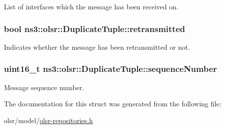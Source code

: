 List of interfaces which the message has been received on. 

\subsubsection[{\texorpdfstring{retransmitted}{retransmitted}}]{\setlength{\rightskip}{0pt plus 5cm}bool ns3\+::olsr\+::\+Duplicate\+Tuple\+::retransmitted}\hypertarget{structns3_1_1olsr_1_1DuplicateTuple_acab89a10cc5023318dc97c5adbb4789b}{}\label{structns3_1_1olsr_1_1DuplicateTuple_acab89a10cc5023318dc97c5adbb4789b}


Indicates whether the message has been retransmitted or not. 

\subsubsection[{\texorpdfstring{sequence\+Number}{sequenceNumber}}]{\setlength{\rightskip}{0pt plus 5cm}uint16\+\_\+t ns3\+::olsr\+::\+Duplicate\+Tuple\+::sequence\+Number}\hypertarget{structns3_1_1olsr_1_1DuplicateTuple_a6d641a58306414310e21b7acfc1aa832}{}\label{structns3_1_1olsr_1_1DuplicateTuple_a6d641a58306414310e21b7acfc1aa832}


Message sequence number. 



The documentation for this struct was generated from the following file\+:\begin{DoxyCompactItemize}
\item 
olsr/model/\hyperlink{olsr-repositories_8h}{olsr-\/repositories.\+h}\end{DoxyCompactItemize}
